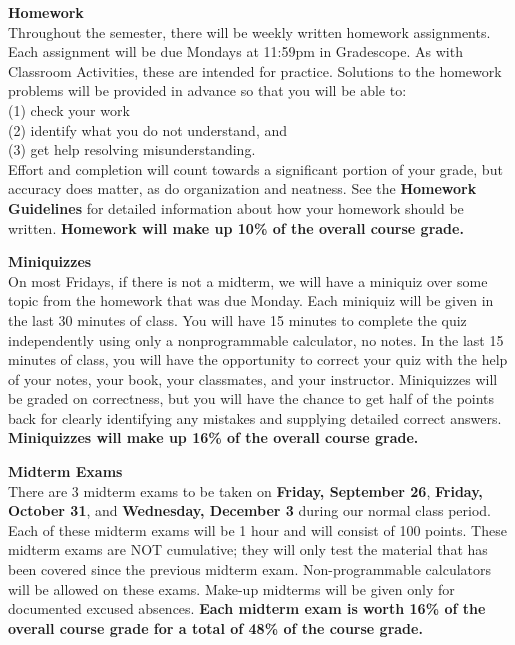 \documentclass[11pt]{article}
\renewcommand{\emph}[1]{\textsf{\textbf{#1}}}
\newcommand{\localhead}[1]{\par\smallskip\textbf{#1} \smallskip\nobreak\\}%
\def\heading#1{\localhead{\large\emph{#1}}}
\begin{document}

\heading{Homework}
Throughout the semester, there will be weekly written homework assignments. Each assignment will be
due Mondays at 11:59pm in Gradescope.  As with Classroom Activities,
these are intended for practice. Solutions to the homework problems will be provided in advance so that you will be able to:\\
(1) check your work\\
(2) identify what you do not understand, and \\
(3) get help resolving misunderstanding.\\
Effort and
completion will count towards a significant portion of your grade, but
accuracy does matter, as do organization and neatness. See the \textbf{Homework Guidelines} for detailed information about how your homework should be written.
{\bf Homework will make up 10\% of the overall course
grade.}

\heading{Miniquizzes}
On most {Fridays}, if there is not a midterm, we will have a miniquiz over some topic from the homework that was due Monday. Each miniquiz will be given in the last 30 minutes of class. You will have 15 minutes to complete the quiz independently using only a nonprogrammable calculator, no notes. In the last 15 minutes of class, you will have the opportunity to correct your quiz with the help of your notes, your book, your classmates, and your instructor. Miniquizzes will be graded on correctness, but you will have the chance to get half of the points back for clearly identifying any mistakes and supplying detailed correct answers. {\bf Miniquizzes will make up 16\% of the overall course
grade.}


\heading{Midterm Exams}
There are 3 midterm exams to be taken on {\bf Friday, September 26},
{\bf Friday, October 31}, and {\bf Wednesday, December 3} during our normal class period. Each of
these midterm exams will be 1 hour and will consist of 100 points. These midterm exams are
NOT cumulative; they will only test the material that has been covered since the previous
midterm exam. Non-programmable calculators will be allowed on these exams. Make-up
midterms will be given only for documented excused absences.
{\bf Each midterm exam is worth 16\% of the overall course grade for a total of 48\% of the course grade.}
\end{document}
